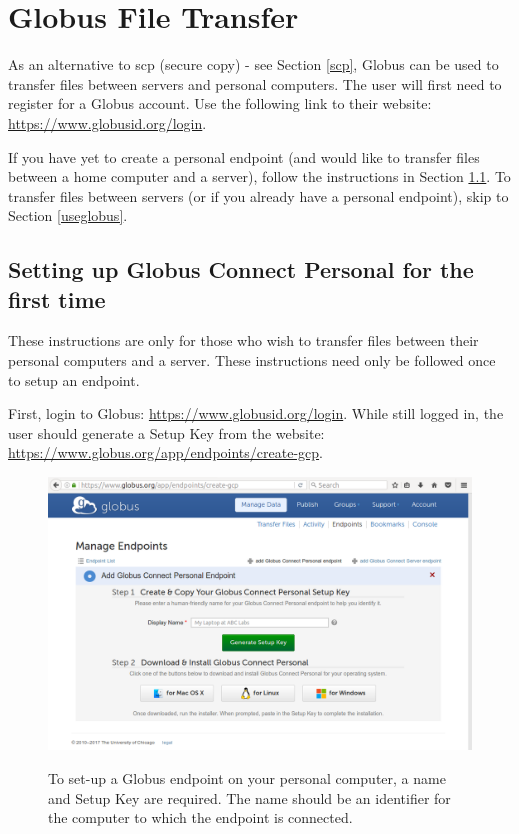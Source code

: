 \documentclass[12pt]{article}
\begin{document}
\section{Globus File Transfer}\label{globus-main}

\quad As an alternative to scp (secure copy) - see Section \ref{scp}, Globus can be used to transfer files between servers and personal computers. The user will first need to register for a Globus account. Use the following link to their website: \url{https://www.globusid.org/login}.

\quad If you have yet to create a personal endpoint (and would like to transfer files between a home computer and a server), follow the instructions in Section \ref{globus-setup}. To transfer files between servers (or if you already have a personal endpoint), skip to Section \ref{useglobus}.

\subsection{Setting up Globus Connect Personal for the first time}\label{globus-setup}

\quad These instructions are only for those who wish to transfer files between their personal computers and a server. These instructions need only be followed once to setup an endpoint. 

\quad First, login to Globus: \url{https://www.globusid.org/login}. While still logged in, the user should generate a Setup Key from the website: \url{https://www.globus.org/app/endpoints/create-gcp}.

\begin{figure}[H]
\centering
\caption{To set-up a Globus endpoint on your personal computer, a name and Setup Key are required. The name should be an identifier for the computer to which the endpoint is connected.}
\includegraphics[width=\textwidth]{globus-1}
\label{globus-1}
\end{figure}
\end{document}
